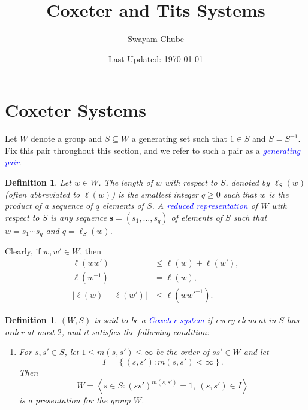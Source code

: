 \documentclass{article}
\title{Coxeter and Tits Systems}
\author{Swayam Chube}
\date{Last Updated: \today}
\theoremstyle{thmstyle}
\theoremstyle{defstyle}
\newtheorem{definition}[theorem]{Definition}
\newcommand{\define}[1]{\textcolor{blue}{\textit{#1}}}
\renewcommand{\le}{\leqslant}
\renewcommand{\ge}{\geqslant}
\begin{document}
\maketitle

\section{Coxeter Systems}

Let $W$ denote a group and $S\subseteq W$ a generating set such that $1\in S$ and $S = S^{-1}$. Fix this pair throughout this section, and we refer to such a pair as a \define{generating pair}.

\begin{definition}
    Let $w\in W$. The length of $w$ with respect to $S$, denoted by $\ell_S(w)$ (often abbreviated to $\ell(w)$) is the smallest integer $q\ge 0$ such that $w$ is the product of a sequence of $q$ elements of $S$. A \define{reduced representation} of $W$ with respect to $S$ is any sequence $\mathbf s = (s_1,\dots,s_q)$ of elements of $S$ such that $w = s_1\cdots s_q$ and $q = \ell_S(w)$.
\end{definition}

Clearly, if $w, w'\in W$, then 
\begin{align*}
    \ell(ww') &\le\ell(w) + \ell(w'),\\
    \ell(w^{-1}) &= \ell(w),\\
    \left|\ell(w) - \ell(w')\right|&\le\ell(ww'^{-1}).
\end{align*}

\begin{definition}
    $(W, S)$ is said to be a \define{Coxeter system} if every element in $S$ has order at most $2$, and it satisfies the following condition: 
    \begin{enumerate}[label=(Cox)]
        \item For $s, s'\in S$, let $1\le m(s, s')\le\infty$ be the order of $ss'\in W$ and let 
        \begin{equation*}
            I = \left\{(s, s')\colon m(s, s') < \infty\right\}.
        \end{equation*}
        Then 
        \begin{equation*}
            W = \left\langle s\in S\colon (ss')^{m(s, s')} = 1,~(s, s')\in I\right\rangle
        \end{equation*}
        is a presentation for the group $W$.\label{coxeter}
    \end{enumerate}
\end{definition}
\end{document}
